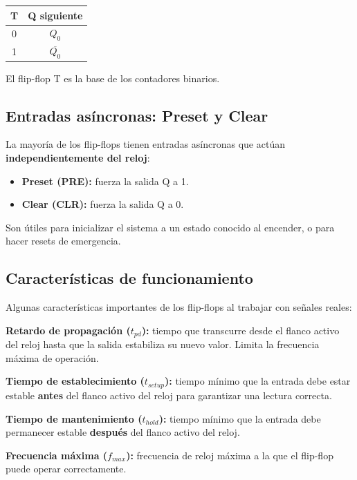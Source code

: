 \begin{table}[H]
\centering
\begin{tabular}{cc}
\toprule
T & Q siguiente \\
\midrule
0 & $Q_0$ \\
1 & $\overline{Q_0}$ \\
\bottomrule
\end{tabular}
\end{table}

El flip-flop T es la base de los contadores binarios.

\subsection{Entradas asíncronas: Preset y Clear}

La mayoría de los flip-flops tienen entradas asíncronas que actúan \textbf{independientemente del reloj}:

\begin{itemize}
    \item \textbf{Preset (PRE):} fuerza la salida Q a 1.
    \item \textbf{Clear (CLR):} fuerza la salida Q a 0.
\end{itemize}

Son útiles para inicializar el sistema a un estado conocido al encender, o para hacer resets de emergencia.

\subsection{Características de funcionamiento}

Algunas características importantes de los flip-flops al trabajar con señales reales:

\textbf{Retardo de propagación ($t_{pd}$):} tiempo que transcurre desde el flanco activo del reloj hasta que la salida estabiliza su nuevo valor. Limita la frecuencia máxima de operación.

\textbf{Tiempo de establecimiento ($t_{setup}$):} tiempo mínimo que la entrada debe estar estable \textbf{antes} del flanco activo del reloj para garantizar una lectura correcta.

\textbf{Tiempo de mantenimiento ($t_{hold}$):} tiempo mínimo que la entrada debe permanecer estable \textbf{después} del flanco activo del reloj.

\textbf{Frecuencia máxima ($f_{max}$):} frecuencia de reloj máxima a la que el flip-flop puede operar correctamente.

